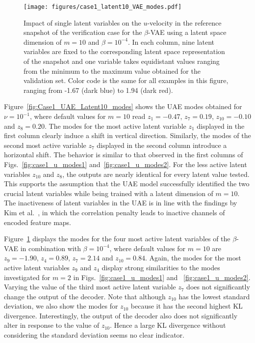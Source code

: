 \begin{figure}[h!]
    \centering
    \texttt{[image: figures/case1\_latent10\_VAE\_modes.pdf]}
    \caption{Impact of single latent variables on the $u$-velocity in the reference snapshot  of the verification case for the $\beta$-VAE using a latent space dimension of $m=10$ and $\beta=10^{-4}$.
    In each column, nine latent variables are fixed to the corresponding latent space representation of the snapshot and one variable takes equidistant values ranging from the minimum to the maximum value obtained
    for the validation set.
    Color code is the same for all examples in this figure, ranging from -1.67 (dark blue) to 1.94 (dark red).}
    \label{fig:Case1_VAE_Latent10_modes}
\end{figure}

Figure~\ref{fig:Case1_UAE_Latent10_modes} shows the UAE modes obtained for  $\nu=10^{-1}$, where default values for $m=10$ read {$z_1=-0.47$, $z_7=0.19$, $z_{10}=-0.10$ and $z_8=0.20$.}
The modes for the most active latent variable $z_1$ displayed in the first column clearly induce a shift in vertical direction. Similarly, the modes of the second most active variable $z_7$ displayed in the second column  introduce a horizontal shift. 
 The behavior is similar to that observed in the first columns of  Figs.~\ref{fig:case1_u_modes1} and~\ref{fig:case1_u_modes2}.
%
For the less active latent variables $z_{10}$ and $z_8$, the outputs are nearly identical for every latent value tested. 
This supports the assumption that the UAE model successfully identified the two crucial latent variables while being trained with a latent dimension of $m=10$. 
The inactiveness of latent variables in the UAE is in line with the findings by Kim et al.~\cite{KIM2021148}, in which the correlation penalty leads to inactive channels of encoded feature maps.

Figure~\ref{fig:Case1_VAE_Latent10_modes} displays the modes for the four most active latent variables of the $\beta$-VAE in combination with $\beta=10^{-4}$, where default values for $m=10$ are {$z_9=-1.90$, $z_4=0.89$, $z_{7}=2.14$ and $z_{10}=0.84$}. Again, the modes for the most active latent variables $z_9$ and $z_4$ display strong similarities to the modes investigated for $m=2$ in Figs.~\ref{fig:case1_u_modes1} and ~\ref{fig:case1_u_modes2}. 
Varying the value of the third most active latent variable $z_7$ does not significantly change the output of the decoder. Note that although $z_{10}$ has the lowest standard deviation, we also show the modes for $z_{10}$ because it has the second highest KL divergence. Interestingly, the output of the decoder also does not significantly alter in response to the value of $z_{10}$. Hence a large KL divergence without considering the standard deviation seems no clear indicator.

